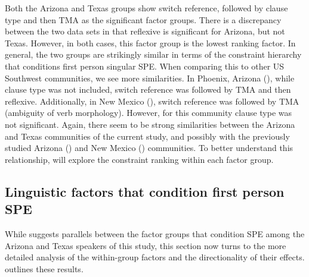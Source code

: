 \documentclass[output=paper]{langscibook}
\begin{document}
Both the Arizona and Texas groups show switch reference, followed by clause type and then TMA as the significant factor groups. There is a discrepancy between the two data sets in that reflexive is significant for Arizona, but not Texas. However, in both cases, this factor group is the lowest ranking factor. In general, the two groups are strikingly similar in terms of the constraint hierarchy that conditions first person singular SPE. When comparing this to other US Southwest communities, we see more similarities. In Phoenix, Arizona (\citealt{Cerrón-Palomino2016}), while clause type was not included, switch reference was followed by TMA and then reflexive. Additionally, in New Mexico (\citealt{TorresCacoullosTravis2010a}), switch reference was followed by TMA (ambiguity of verb morphology). However, for this community clause type was not significant. Again, there seem to be strong similarities between the Arizona and Texas communities of the current study, and possibly with the previously studied Arizona (\citealt{Cerrón-Palomino2016}) and New Mexico (\citealt{TorresCacoullosTravis2010a}) communities. To better understand this relationship,  will explore the constraint ranking within each factor group.



\subsection{Linguistic factors that condition first person SPE}\label{sec:aztx:3.3}\largerpage

\begin{sloppypar}
While  suggests parallels between the factor groups that condition SPE among the Arizona and Texas speakers of this study, this section now turns to the more detailed analysis of the within-group factors and the directionality of their effects.  outlines these results.
\end{sloppypar}
\end{document}
